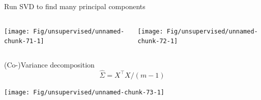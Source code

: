 \documentclass[
  ignorenonframetext,
  aspectratio=169]{beamer}
\newenvironment{Shaded}{\begin{snugshade}}{\end{snugshade}}
\newcommand{\AttributeTok}[1]{\textcolor[rgb]{0.77,0.63,0.00}{#1}}
\newcommand{\DecValTok}[1]{\textcolor[rgb]{0.00,0.00,0.81}{#1}}
\newcommand{\FunctionTok}[1]{\textcolor[rgb]{0.00,0.00,0.00}{#1}}
\newcommand{\NormalTok}[1]{#1}
\newcommand{\OtherTok}[1]{\textcolor[rgb]{0.56,0.35,0.01}{#1}}
\newcommand{\SpecialCharTok}[1]{\textcolor[rgb]{0.00,0.00,0.00}{#1}}
\begin{document}
\begin{frame}[fragile]{Run SVD to find many principal components}
\protect\hypertarget{run-svd-to-find-many-principal-components}{}
\large

\begin{Shaded}
\end{Shaded}

\normalsize

\begin{columns}[T]
\begin{column}{.25\textwidth}
\scriptsize

\begin{center}\texttt{[image: Fig/unsupervised/unnamed-chunk-71-1]} \end{center}

\normalsize
\end{column}

\begin{column}{.65\textwidth}
\scriptsize

\begin{center}\texttt{[image: Fig/unsupervised/unnamed-chunk-72-1]} \end{center}

\normalsize
\end{column}
\end{columns}
\end{frame}

\begin{frame}{(Co-)Variance decomposition}
\protect\hypertarget{co-variance-decomposition}{}
\[\hat{\Sigma} = X^{\top}X/(m-1)\]

\scriptsize

\begin{center}\texttt{[image: Fig/unsupervised/unnamed-chunk-73-1]} \end{center}

\normalsize
\end{frame}
\end{document}

